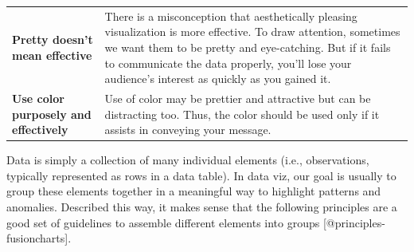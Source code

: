 \documentclass[]{book}
\theoremstyle{definition}
\theoremstyle{definition}
\theoremstyle{definition}
\theoremstyle{remark}
\begin{document}
\begin{longtable}[]{@{}ll@{}}
\begin{minipage}[t]{0.16\columnwidth}
\textbf{Pretty doesn't mean effective}\strut
\end{minipage} & \begin{minipage}[t]{0.78\columnwidth}\raggedright\strut
There is a misconception that aesthetically pleasing visualization is
more effective. To draw attention, sometimes we want them to be pretty
and eye-catching. But if it fails to communicate the data properly,
you'll lose your audience's interest as quickly as you gained it.\strut
\end{minipage}\tabularnewline
\begin{minipage}[t]{0.16\columnwidth}\raggedright\strut
\textbf{Use color purposely and effectively}\strut
\end{minipage} & \begin{minipage}[t]{0.78\columnwidth}\raggedright\strut
Use of color may be prettier and attractive but can be distracting too.
Thus, the color should be used only if it assists in conveying your
message.\strut
\end{minipage}\tabularnewline
\bottomrule
\end{longtable}

Data is simply a collection of many individual elements (i.e.,
observations, typically represented as rows in a data table). In data
viz, our goal is usually to group these elements together in a
meaningful way to highlight patterns and anomalies. Described this way,
it makes sense that the following principles are a good set of
guidelines to assemble different elements into groups
{[}@principles-fusioncharts{]}.
\end{document}
